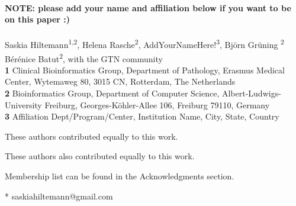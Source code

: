 \documentclass[10pt,letterpaper]{article}
\begin{document}
\vspace*{0.2in}

\begin{flushleft}
{\Large
\textbf{} %
}
\newline
\\
\textbf{NOTE: please add your name and affiliation below if you want to be on this paper :)}\\
\ \\
Saskia Hiltemann\textsuperscript{1,2\Yinyang\textpilcrow},
Helena Rasche\textsuperscript{2\Yinyang},
AddYourNameHere!\textsuperscript{3},
Björn Grüning \textsuperscript{2\ddag}
Bérénice Batut\textsuperscript{2\ddag},
with the GTN community
\\
\bigskip
\textbf{1} Clinical Bioinformatics Group, Department of Pathology, Erasmus Medical Center, Wytemaweg 80, 3015 CN, Rotterdam, The Netherlands \\
\textbf{2} Bioinformatics Group, Department of Computer Science, Albert-Ludwigs-University Freiburg, Georges-Köhler-Allee 106, Freiburg 79110, Germany \\
\textbf{3} Affiliation Dept/Program/Center, Institution Name, City, State, Country \\
\bigskip

%
%
\Yinyang These authors contributed equally to this work.

\ddag These authors also contributed equally to this work.



\textpilcrow Membership list can be found in the Acknowledgments section.

* saskiahiltemann@gmail.com

\end{flushleft}
\end{document}
